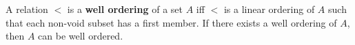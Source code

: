 A relation $<$ is a \textbf{well ordering} of a set $A$ iff $<$ is a linear ordering of $A$ such that each non-void subset has a first member. If there exists a well ordering of $A$, then $A$ can be well ordered.
